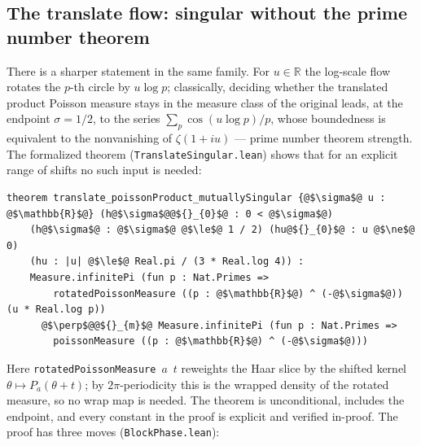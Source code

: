 \documentclass[a4paper,UKenglish,autoref,thm-restate]{lipics-v2021}
\newcommand{\leanid}[1]{{\def\_{\textunderscore\allowbreak}\texttt{#1}}}
\begin{document}
\subsection{The translate flow: singular without the prime number theorem}
\label{sec:app-translate}

There is a sharper statement in the same family. For $u \in \mathbb{R}$ the
log-scale flow rotates the $p$-th circle by $u \log p$; classically, deciding
whether the translated product Poisson measure stays in the measure class of
the original leads, at the endpoint $\sigma = 1/2$, to the series
$\sum_p \cos(u \log p)/p$, whose boundedness is equivalent to the
nonvanishing of $\zeta(1+iu)$ --- prime number theorem strength. The
formalized theorem (\texttt{TranslateSingular.lean}) shows that for an
explicit range of shifts no such input is needed:
\begin{lstlisting}[basicstyle=\footnotesize\ttfamily]
theorem translate_poissonProduct_mutuallySingular {@$\sigma$@ u : @$\mathbb{R}$@} (h@$\sigma$@@${}_{0}$@ : 0 < @$\sigma$@)
    (h@$\sigma$@ : @$\sigma$@ @$\le$@ 1 / 2) (hu@${}_{0}$@ : u @$\ne$@ 0)
    (hu : |u| @$\le$@ Real.pi / (3 * Real.log 4)) :
    Measure.infinitePi (fun p : Nat.Primes =>
        rotatedPoissonMeasure ((p : @$\mathbb{R}$@) ^ (-@$\sigma$@)) (u * Real.log p))
      @$\perp$@@${}_{m}$@ Measure.infinitePi (fun p : Nat.Primes =>
        poissonMeasure ((p : @$\mathbb{R}$@) ^ (-@$\sigma$@)))
\end{lstlisting}
Here \leanid{rotatedPoissonMeasure}~$a$~$t$ reweights the Haar slice by the
shifted kernel $\theta \mapsto P_a(\theta + t)$; by $2\pi$-periodicity this is
the wrapped density of the rotated measure, so no wrap map is needed. The
theorem is unconditional, includes the endpoint, and every constant in the
proof is explicit and verified in-proof. The proof has three moves
(\texttt{BlockPhase.lean}):
\end{document}
